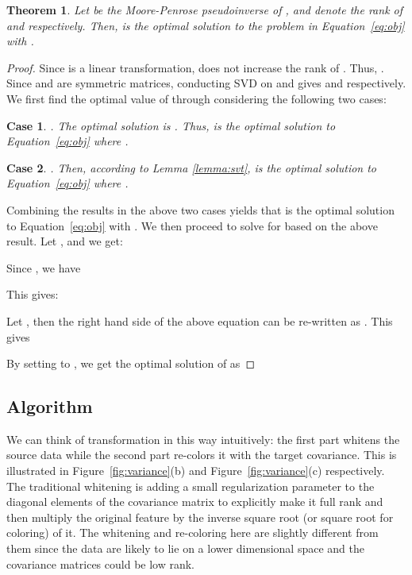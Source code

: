 \documentclass[letterpaper]{article}
\newtheorem{theorem}{Theorem}
\newtheorem{case}{Case}
\begin{document}
\begin{theorem} 
Let  be the Moore-Penrose pseudoinverse of ,  and  denote the rank of  and  respectively.
Then,  is the optimal solution to the problem in Equation~\eqref{eq:obj} with .
\end{theorem}
\begin{proof}  Since  is a linear transformation,  does not increase the rank of . Thus, . Since  and  are symmetric matrices, conducting SVD on  and  gives  and  respectively. We first find the optimal value of  through considering the following two  cases:
\vspace{-0.05in}
\begin{case}
. The optimal solution is . Thus,  is the optimal solution to Equation~\eqref{eq:obj} where .
\end{case}
\vspace{-0.05in}
\begin{case}
. Then, according to Lemma \ref{lemma:svt},  is the optimal solution to Equation~\eqref{eq:obj} where .
\end{case}
Combining the results in the above two cases yields that  is the optimal solution to Equation~\eqref{eq:obj} with .
We then proceed to solve for  based on the above result. 
Let , and we get:

Since , we have

This gives:

Let , then the right hand side of the above equation can be re-written as . This gives

By setting  to , we get the optimal solution of  as 

\end{proof}

\subsection{Algorithm}
\label{subsec:algo}
We can think of transformation  in this way intuitively: the first part  whitens the source data while the second part  re-colors it with the target covariance. This is illustrated in Figure~\ref{fig:variance}(b) and Figure~\ref{fig:variance}(c) respectively. The traditional whitening is adding a small regularization parameter  to the diagonal elements of the covariance matrix to explicitly make it full rank and then multiply the original feature by the inverse square root (or square root for coloring) of it. The whitening and re-coloring here are slightly different from them since the data are likely to lie on a lower dimensional space and the covariance matrices could be low rank. 
\end{document}
